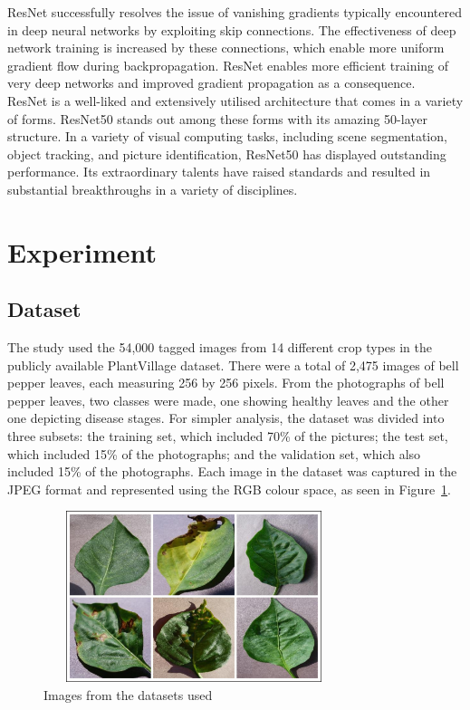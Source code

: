\documentclass[conference]{IEEEtran}
\begin{document}
ResNet successfully resolves the issue of vanishing gradients typically encountered in deep neural networks by exploiting skip connections. The effectiveness of deep network training is increased by these connections, which enable more uniform gradient flow during backpropagation. ResNet enables more efficient training of very deep networks and improved gradient propagation as a consequence.\\

ResNet is a well-liked and extensively utilised architecture that comes in a variety of forms. ResNet50 stands out among these forms with its amazing 50-layer structure. In a variety of visual computing tasks, including scene segmentation, object tracking, and picture identification, ResNet50 has displayed outstanding performance. Its extraordinary talents have raised standards and resulted in substantial breakthroughs in a variety of disciplines.

\section{Experiment}
\subsection{Dataset}
The study used the 54,000 tagged images from 14 different crop types in the publicly available PlantVillage dataset. There were a total of 2,475 images of bell pepper leaves, each measuring 256 by 256 pixels. From the photographs of bell pepper leaves, two classes were made, one showing healthy leaves and the other one depicting disease stages. For simpler analysis, the dataset was divided into three subsets: the training set, which included 70\% of the pictures; the test set, which included 15\% of the photographs; and the validation set, which also included 15\% of the photographs. Each image in the dataset was captured in the JPEG format and represented using the RGB colour space, as seen in Figure~\ref{fig: Figure 2}.


 \begin{figure}[H]
 \includegraphics[width=8.8cm, height=5cm]{dataset.jpg}
\caption{Images from the datasets used}
\label{fig: Figure 2}
\end{figure}
 
\end{document}
